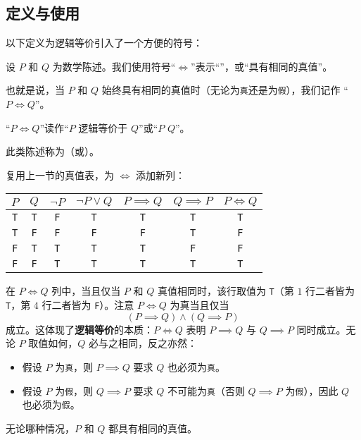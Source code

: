 \subsection{定义与使用}\label{sec:section4.6.1}

以下定义为逻辑等价引入了一个方便的符号：

\begin{definition}
    设 $P$ 和 $Q$ 为数学陈述。我们使用符号``$\iff$''表示``''，或``具有相同的真值''。

    也就是说，当 $P$ 和 $Q$ 始终具有相同的真值时（无论为\verb|真|还是为\verb|假|），我们记作 ``$P \iff Q$''。

    ``$P \iff Q$''读作``$P$ 逻辑等价于 $Q$''或``$P$  $Q$''。

    此类陈述称为（或）。
\end{definition}

复用上一节的真值表，为 $\iff$ 添加新列：
\begin{center}
    \begin{tabular}{c|c|c|c|c|c|c}
          $P$      & $Q$      & $\neg P$ &  $\neg P \lor Q$ & $P \implies Q$ & $Q \implies P$ & $P \iff Q$ \\
          \hline
          \verb|T| & \verb|T| & \verb|F| &      \verb|T|    &    \verb|T|    &    \verb|T|    & \verb|T|\\
          \verb|T| & \verb|F| & \verb|F| &      \verb|F|    &    \verb|F|    &    \verb|T|    & \verb|F|\\
          \verb|F| & \verb|T| & \verb|T| &      \verb|T|    &    \verb|T|    &    \verb|F|    & \verb|F|\\
          \verb|F| & \verb|F| & \verb|T| &      \verb|T|    &    \verb|T|    &    \verb|T|    & \verb|T|\\
    \end{tabular}
\end{center}
在 $P \iff Q$ 列中，当且仅当 $P$ 和 $Q$ 真值相同时，该行取值为 \verb|T|（第 $1$ 行二者皆为 \verb|T|，第 $4$ 行二者皆为 \verb|F|）。注意 $P \iff Q$ 为真当且仅当
\[(P \implies Q) \land (Q \implies P)\]
成立。这体现了\textbf{逻辑等价}的本质：$P \iff Q$ 表明 $P \implies Q$ 与 $Q \implies P$ 同时成立。无论 $P$ 取值如何，$Q$ 必与之相同，反之亦然：
\begin{itemize}
    \item 假设 $P$ 为\verb|真|，则 $P \implies Q$ 要求 $Q$ 也必须为\verb|真|。
    \item 假设 $P$ 为\verb|假|，则 $Q \implies P$ 要求 $Q$ 不可能为\verb|真|（否则 $Q \implies P$ 为\verb|假|），因此 $Q$ 也必须为\verb|假|。
\end{itemize}
无论哪种情况，$P$ 和 $Q$ 都具有相同的真值。

